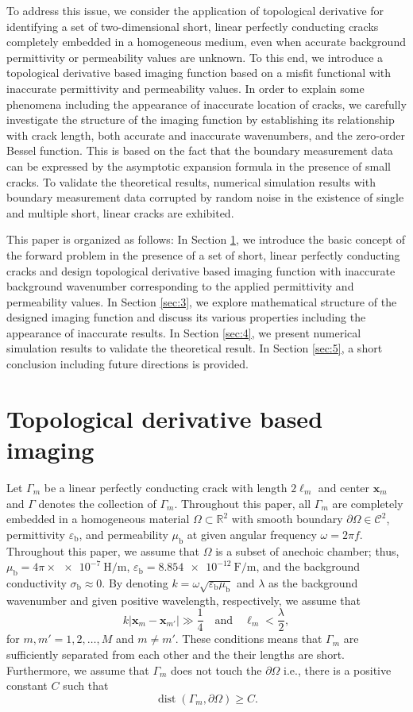 \documentclass[a4,10pt]{article}
\newcommand{\epsb}{\varepsilon_{\mathrm{b}}}
\newcommand{\mub}{\mu_{\mathrm{b}}}
\newcommand{\sigmab}{\sigma_{\mathrm{b}}}
\newcommand{\p}{\partial}
\newcommand{\mx}{\mathbf{x}}
\DeclareMathOperator*{\dist}{dist}
\theoremstyle{plain}
\theoremstyle{remark}
\begin{document}
To address this issue, we consider the application of topological derivative for identifying a set of two-dimensional short, linear perfectly conducting cracks completely embedded in a homogeneous medium, even when accurate background permittivity or permeability values are unknown. To this end, we introduce a topological derivative based imaging function based on a misfit functional with inaccurate permittivity and permeability values. In order to explain some phenomena including the appearance of inaccurate location of cracks, we carefully investigate the structure of the imaging function by establishing its relationship with crack length, both accurate and inaccurate wavenumbers, and the zero-order Bessel function. This is based on the fact that the boundary measurement data can be expressed by the asymptotic expansion formula in the presence of small cracks. To validate the theoretical results,
numerical simulation results with boundary measurement data corrupted by random noise in the existence of single and multiple short, linear cracks are exhibited.

This paper is organized as follows: In Section \ref{sec:2}, we introduce the basic concept of the forward problem in the presence of a set of short, linear perfectly conducting cracks and design topological derivative based imaging function with inaccurate background wavenumber corresponding to the applied permittivity and permeability values. In Section \ref{sec:3}, we explore mathematical structure of the designed imaging function and discuss its various properties including the appearance of inaccurate results. In Section \ref{sec:4}, we  present numerical simulation results to validate the theoretical result. In Section \ref{sec:5}, a short conclusion including future directions is provided.

\section{Topological derivative based imaging}\label{sec:2}
Let $\Gamma_m$ be a linear perfectly conducting crack with length $2\ell_m$ and center $\mx_m$ and $\Gamma$ denotes the collection of $\Gamma_m$. Throughout this paper, all $\Gamma_m$ are completely embedded in a homogeneous material $\Omega\subset\mathbb{R}^2$ with smooth boundary $\p\Omega\in\mathcal{C}^2$, permittivity $\epsb$, and permeability $\mub$ at given angular frequency $\omega=2\pi f$. Throughout this paper, we assume that $\Omega$ is a subset of anechoic chamber; thus, $\mub=4\pi\times\SI{e-7}{\henry/\meter}$, $\epsb=\SI{8.854e-12}{\farad/\meter}$, and the background conductivity $\sigmab\approx0$. By denoting $k=\omega\sqrt{\epsb\mub}$ and $\lambda$ as the background wavenumber and given positive wavelength, respectively, we assume that
\begin{equation}\label{condition}
k|\mx_m-\mx_{m'}|\gg\frac14\quad\text{and}\quad\ell_m<\frac{\lambda}{2},
\end{equation}
for $m,m'=1,2,\ldots,M$ and $m\ne m'$. These conditions means that $\Gamma_m$ are sufficiently separated from each
other and the their lengths are short. Furthermore, we assume that $\Gamma_m$ does not touch the $\p\Omega$ i.e., there is a positive constant $C$ such that
\[\dist(\Gamma_m,\p\Omega)\geq C.\]
\end{document}

